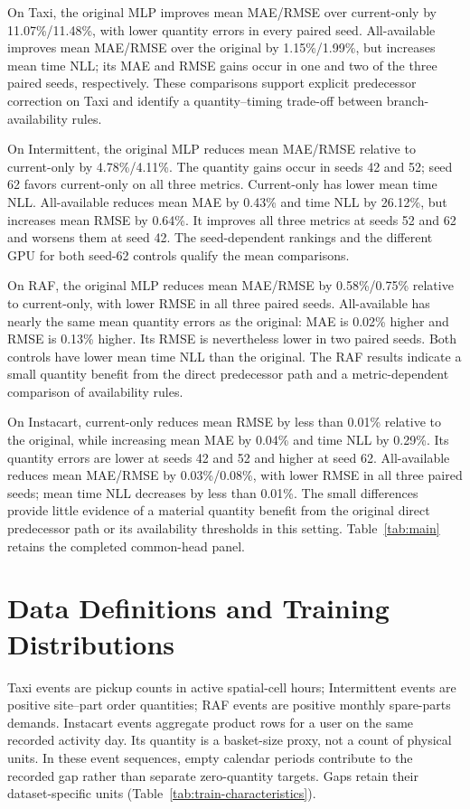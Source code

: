 \documentclass[runningheads]{llncs}
\begin{document}
On Taxi, the original MLP improves mean MAE/RMSE over current-only by
11.07\%/11.48\%, with lower quantity errors in every paired seed.
All-available improves mean MAE/RMSE over the original by 1.15\%/1.99\%,
but increases mean time NLL; its MAE and RMSE gains occur in one and two
of the three paired seeds, respectively. These comparisons support
explicit predecessor correction on Taxi and identify a quantity--timing
trade-off between branch-availability rules.

On Intermittent, the original MLP reduces mean MAE/RMSE relative to
current-only by 4.78\%/4.11\%. The quantity gains occur in seeds 42 and 52;
seed 62 favors current-only on all three metrics. Current-only has lower
mean time NLL. All-available reduces mean MAE by 0.43\% and time NLL by
26.12\%, but increases mean RMSE by 0.64\%. It improves all three metrics
at seeds 52 and 62 and worsens them at seed 42. The seed-dependent rankings
and the different GPU for both seed-62 controls qualify the mean comparisons.

On RAF, the original MLP reduces mean MAE/RMSE by 0.58\%/0.75\% relative
to current-only, with lower RMSE in all three paired seeds. All-available
has nearly the same mean quantity errors as the original: MAE is 0.02\%
higher and RMSE is 0.13\% higher. Its RMSE is nevertheless lower in two
paired seeds. Both controls have lower mean time NLL than the original.
The RAF results indicate a small quantity benefit from the direct
predecessor path and a metric-dependent comparison of availability rules.

On Instacart, current-only reduces mean RMSE by less than 0.01\% relative
to the original, while increasing mean MAE by 0.04\% and time NLL by 0.29\%.
Its quantity errors are lower at seeds 42 and 52 and higher at seed 62.
All-available reduces mean MAE/RMSE by 0.03\%/0.08\%, with lower RMSE in all
three paired seeds; mean time NLL decreases by less than 0.01\%.
The small differences provide little evidence of a material quantity benefit
from the original direct predecessor path or its availability thresholds in
this setting. Table~\ref{tab:main} retains the completed common-head panel.


\section{Data Definitions and Training Distributions}\label{app:data-characteristics}
Taxi events are pickup counts in active spatial-cell hours; Intermittent
events are positive site--part order quantities; RAF events are positive
monthly spare-parts demands. Instacart events aggregate product rows for a
user on the same recorded activity day. Its quantity is a basket-size proxy,
not a count of physical units. In these event sequences, empty calendar
periods contribute to the recorded gap rather than separate zero-quantity
targets. Gaps retain their dataset-specific units (Table~\ref{tab:train-characteristics}).
\end{document}

